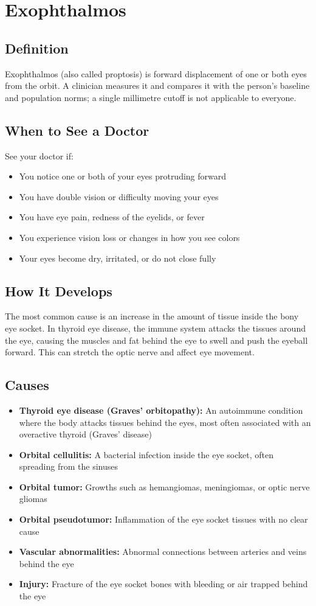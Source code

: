 \chapter{Exophthalmos}

\section*{Definition}
Exophthalmos (also called proptosis) is forward displacement of one or both eyes from the orbit. A clinician measures it and compares it with the person's baseline and population norms; a single millimetre cutoff is not applicable to everyone.

\section*{When to See a Doctor}
See your doctor if:
\begin{itemize}
  \item You notice one or both of your eyes protruding forward
  \item You have double vision or difficulty moving your eyes
  \item You have eye pain, redness of the eyelids, or fever
  \item You experience vision loss or changes in how you see colors
  \item Your eyes become dry, irritated, or do not close fully
\end{itemize}

\section*{How It Develops}
The most common cause is an increase in the amount of tissue inside the bony eye socket. In thyroid eye disease, the immune system attacks the tissues around the eye, causing the muscles and fat behind the eye to swell and push the eyeball forward. This can stretch the optic nerve and affect eye movement.

\section*{Causes}
\begin{itemize}
  \item \textbf{Thyroid eye disease (Graves' orbitopathy):} An autoimmune condition where the body attacks tissues behind the eyes, most often associated with an overactive thyroid (Graves' disease)
  \item \textbf{Orbital cellulitis:} A bacterial infection inside the eye socket, often spreading from the sinuses
  \item \textbf{Orbital tumor:} Growths such as hemangiomas, meningiomas, or optic nerve gliomas
  \item \textbf{Orbital pseudotumor:} Inflammation of the eye socket tissues with no clear cause
  \item \textbf{Vascular abnormalities:} Abnormal connections between arteries and veins behind the eye
  \item \textbf{Injury:} Fracture of the eye socket bones with bleeding or air trapped behind the eye
\end{itemize}

